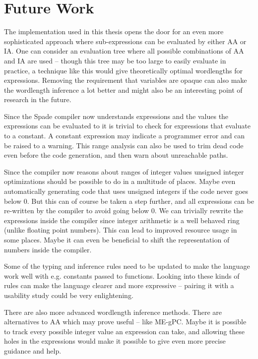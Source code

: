 \chapter{Future Work}
The implementation used in this thesis opens the door for an even more sophisticated approach where sub-expressions can be evaluated by either AA or IA. One can consider an evaluation tree where all possible combinations of AA and IA are used -- though this tree may be too large to easily evaluate in practice, a technique like this would give theoretically optimal wordlengths for expressions. Removing the requirement that variables are opaque can also make the wordlength inference a lot better and might also be an interesting point of research in the future.

Since the Spade compiler now understands expressions and the values the expressions can be evaluated to it is trivial to check for expressions that evaluate to a constant. A constant expression may indicate a programmer error and can be raised to a warning. This range analysis can also be used to trim dead code even before the code generation, and then warn about unreachable paths.

Since the compiler now reasons about ranges of integer values unsigned integer optimizations should be possible to do in a multitude of places. Maybe even automatically generating code that uses unsigned integers if the code never goes below 0. But this can of course be taken a step further, and all expressions can be re-written by the compiler to avoid going below 0. We can trivially rewrite the expressions inside the compiler since integer arithmetic is a well behaved ring (unlike floating point numbers). This can lead to improved resource usage in some places. Maybe it can even be beneficial to shift the representation of numbers inside the compiler.

Some of the typing and inference rules need to be updated to make the language work well with e.g. constants passed to functions. Looking into these kinds of rules can make the language clearer and more expressive -- pairing it with a usability study could be very enlightening.

There are also more advanced wordlength inference methods. There are alternatives to AA which may prove useful -- like ME-gPC. Maybe it is possible to track every possible integer value an expression can take, and allowing these holes in the expressions would make it possible to give even more precise guidance and help.

